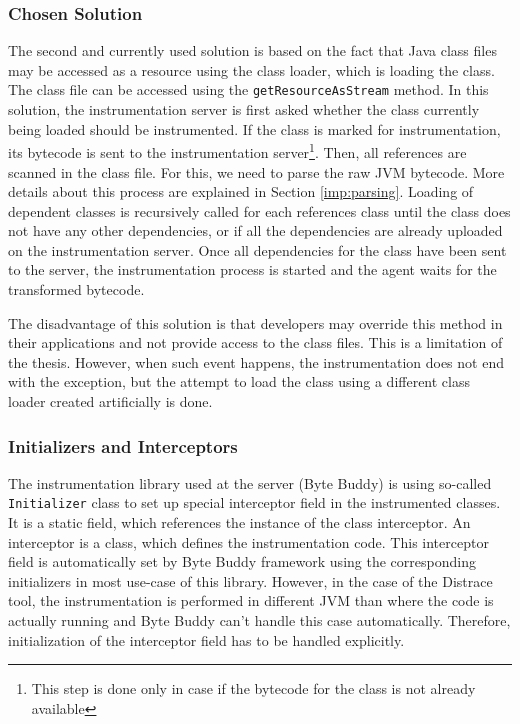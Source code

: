 \subsubsection{Chosen Solution}
The second and currently used solution is based on the fact that Java class files may be accessed as a resource using the class loader, which is loading the class. The class file can be accessed using the \texttt{getResourceAsStream} method. In this solution, the instrumentation server is first asked whether the class currently being loaded should be instrumented. If the class is marked for instrumentation, its bytecode is sent to the instrumentation server\footnote{This step is done only in case if the bytecode for the class is not already available}. Then, all references are scanned in the class file. For this, we need to parse the raw JVM bytecode. More details about this process are explained in Section \ref{imp:parsing}. Loading of dependent classes is recursively called for each references class until the class does not have any other dependencies, or if all the dependencies are already uploaded on the instrumentation server. Once all dependencies for the class have been sent to the server, the instrumentation process is started and the agent waits for the transformed bytecode. 

The disadvantage of this solution is that developers may override this method in their applications and not provide access to the class files. This is a limitation of the thesis. However, when such event happens, the instrumentation does not end with the exception, but the attempt to load the class using a different class loader created artificially is done. 

\subsubsection{Initializers and Interceptors}
The instrumentation library used at the server (Byte Buddy) is using so-called \texttt{Initializer} class to set up special interceptor field in the instrumented classes. It is a static field, which references the instance of the class interceptor. An interceptor is a class, which defines the instrumentation code. This interceptor field is automatically set by Byte Buddy framework using the corresponding initializers in most use-case of this library. However, in the case of the Distrace tool, the instrumentation is performed in different JVM than where the code is actually running and Byte Buddy can't handle this case automatically. Therefore, initialization of the interceptor field has to be handled explicitly.

